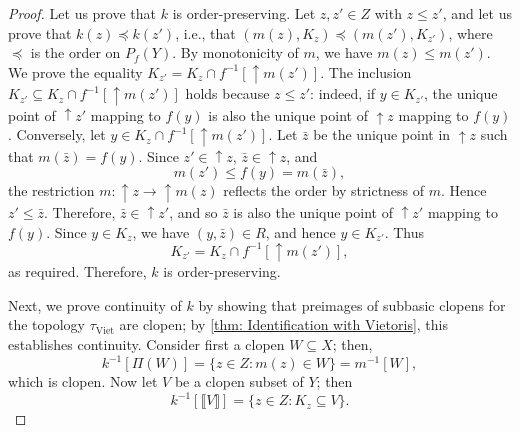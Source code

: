 \documentclass[12pt]{amsart}
\theoremstyle{plain}
\theoremstyle{definition}
\newcommand{\Viet}{\mathrm{Viet}}
\renewcommand{\u}{{\uparrow}}
\begin{document}
\begin{proof}
    
    Let us prove that $k$ is order-preserving. Let $z,z' \in Z$ with $z\leq z'$, and let us prove that $k(z) \preceq k(z')$, i.e., that $(m(z), K_z) \preceq (m(z'), K_{z'})$, where $\preceq$ is the order on $P_f(Y)$.
    By monotonicity of $m$, we have $m(z)\leq m(z')$.
    We prove the equality $K_{z'}=K_z\cap f^{-1}[\u m(z')]$. 
    The inclusion $K_{z'}\subseteq K_z\cap f^{-1}[\u m(z')]$ holds because $z\leq z'$: indeed, if $y\in K_{z'}$, the unique point of $\u z'$ mapping to $f(y)$ is also the unique point of $\u z$ mapping to $f(y)$.
    Conversely, let $y\in K_z\cap f^{-1}[\u m(z')]$. Let $\bar z$ be the unique point in $\u z$ such that $m(\bar z)=f(y)$. Since $z'\in \u z$, $\bar z\in \u z$, and
    \[
        m(z')\leq f(y)=m(\bar z),
    \]
    the restriction $m\colon \u z\to \u m(z)$ reflects the order by strictness of $m$. Hence $z'\leq \bar z$. Therefore, $\bar z\in \u z'$, and so $\bar z$ is also the unique point of $\u z'$ mapping to $f(y)$. Since $y\in K_z$, we have $(y,\bar z)\in R$, and hence $y\in K_{z'}$. Thus
    \[
        K_{z'}=K_z\cap f^{-1}[\u m(z')],
    \]
    as required.
    Therefore, $k$ is order-preserving.


    Next, we prove continuity of $k$ by showing that preimages of subbasic clopens for the topology $\tau_{\Viet}$ are clopen; by \cref{thm: Identification with Vietoris}, this establishes continuity. Consider first a clopen $W\subseteq X$; then,
    \[
        k^{-1}[\Pi(W)]=\{z\in Z : m(z)\in W\}=m^{-1}[W],
    \]
    which is clopen.
    Now let $V$ be a clopen subset of $Y$; then
    \[
        k^{-1}[\llbracket V\rrbracket]=\{z\in Z : K_{z}\subseteq V\}.
    \]
    

\end{proof}
\end{document}
